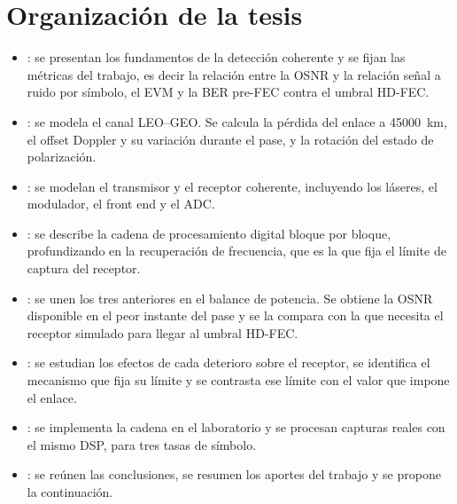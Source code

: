 \section{Organizaci\'on de la tesis}
\label{sec:intro-organizacion}

\begin{itemize}
  \item {}: se presentan los fundamentos de la detecci\'on
        coherente y se fijan las m\'etricas del trabajo, es decir la relaci\'on
        entre la OSNR y la relaci\'on se\~nal a ruido por s\'imbolo, el EVM y
        la BER pre-FEC contra el umbral HD-FEC.

  \item {}: se modela el canal LEO--GEO. Se calcula la p\'erdida
        del enlace a \SI{45000}{\kilo\metre}, el offset Doppler y su
        variaci\'on durante el pase, y la rotaci\'on del estado de
        polarizaci\'on.

  \item {}: se modelan el transmisor y el receptor
        coherente, incluyendo los l\'aseres, el modulador, el front end y el
        ADC.

  \item {}: se describe la cadena de procesamiento digital bloque
        por bloque, profundizando en la recuperaci\'on de frecuencia, que es la
        que fija el l\'imite de captura del receptor.

  \item {}: se unen los tres anteriores en el balance de
        potencia. Se obtiene la OSNR disponible en el peor instante del pase y
        se la compara con la que necesita el receptor simulado para llegar al
        umbral HD-FEC.

  \item {}: se estudian los efectos de cada deterioro sobre
        el receptor, se identifica el mecanismo que fija su l\'imite y se
        contrasta ese l\'imite con el valor que impone el enlace.

  \item {}: se implementa la cadena en el laboratorio y se
        procesan capturas reales con el mismo DSP, para tres tasas de
        s\'imbolo.

  \item {}: se re\'unen las conclusiones, se resumen los
        aportes del trabajo y se propone la continuaci\'on.

\end{itemize}
